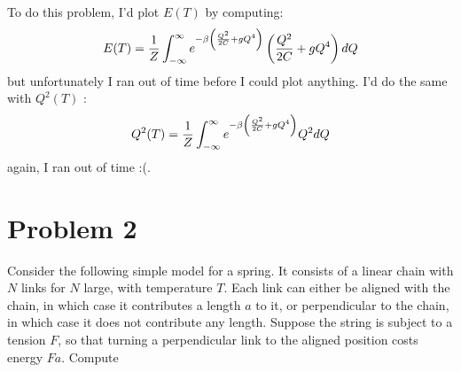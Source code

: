 \documentclass[10pt]{article}
\begin{document}
\begin{enumerate}[label=\alph*)]
			\begin{solution}
				To do this problem, I'd plot \(E(T)\) by computing:
				\[
				E(T) = \frac{1}{Z} \int_{-\infty}^{\infty} e^{-\beta \left( \frac{Q^2}{2C} + gQ^4 \right) }\left( \frac{Q^2}{2C} + gQ^4 \right) dQ 
				\] 
				but unfortunately I ran out of time before I could plot anything. I'd do the same with 
				\(Q^2(T)\) :
				\[
				Q^2(T) = \frac{1}{Z} \int_{-\infty}^{\infty} e^{-\beta\left( \frac{Q^2}{2C} + gQ^4 \right)} Q^2 dQ
				\] 
				again, I ran out of time :(.
			\end{solution}
	\end{enumerate}
	\pagebreak
	\section*{Problem 2}
	Consider the following simple model for a spring. It consists of a linear chain with \(N\) links for 
	\(N\) large, with temperature \(T\). Each link can either be aligned with the chain, in which case it 
	contributes a length \(a\) to it, or perpendicular to the chain, in which case it does not contribute 
	any length. Suppose the string is subject to a tension \(F\), so that turning a perpendicular link to 
	the aligned position costs energy \(Fa\). Compute
\end{document}
